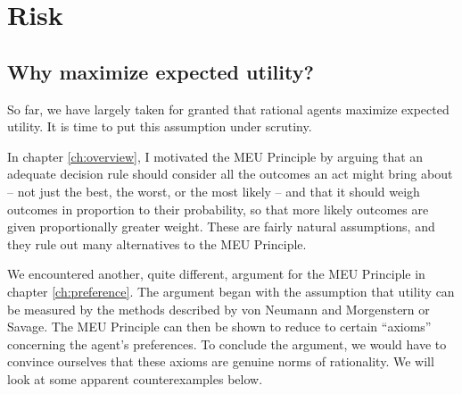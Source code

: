 \chapter{Risk}\label{ch:risk}



\section{Why maximize expected utility?}\label{sec:why-meu}

So far, we have largely taken for granted that rational agents
maximize expected utility. It is time to put this assumption under
scrutiny.

In chapter \ref{ch:overview}, I motivated the MEU Principle by arguing
that an adequate decision rule should consider all the outcomes an act
might bring about -- not just the best, the worst, or the most likely
-- and that it should weigh outcomes in proportion to their
probability, so that more likely outcomes are given proportionally
greater weight. These are fairly natural assumptions, and they rule
out many alternatives to the MEU Principle.

We encountered another, quite different, argument for the MEU
Principle in chapter \ref{ch:preference}. The argument began with the
assumption that utility can be measured by the methods described by
von Neumann and Morgenstern or Savage. The MEU Principle can then be
shown to reduce to certain ``axioms'' concerning the agent's
preferences. To conclude the argument, we would have to convince
ourselves that these axioms are genuine norms of rationality. We will
look at some apparent counterexamples below.

